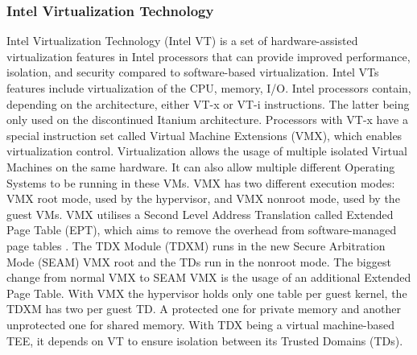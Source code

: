 \subsubsection{Intel Virtualization Technology}
Intel Virtualization Technology (Intel VT) is a set of hardware-assisted virtualization features in Intel processors that can provide improved performance, isolation, and security compared to software-based virtualization. Intel VTs features include virtualization of the CPU, memory, I/O.
Intel processors contain, depending on the architecture, either VT-x or VT-i instructions. The latter being only used on the discontinued Itanium architecture. Processors with VT-x have a special instruction set called Virtual Machine Extensions (VMX), which enables virtualization control. Virtualization allows the usage of multiple isolated Virtual Machines on the same hardware. It can also allow multiple different Operating Systems to be running in these VMs\cite{intel-VT}. VMX has two different execution modes: VMX root mode, used by the hypervisor, and VMX nonroot mode, used by the guest VMs. VMX utilises a Second Level Address Translation called Extended Page Table (EPT), which aims to remove the overhead from software-managed page tables \cite{uhlig_intel_vt_2005}. The TDX Module (TDXM) runs in the new Secure Arbitration Mode (SEAM) VMX root and the TDs run in the nonroot mode. The biggest change from normal VMX to SEAM VMX is the usage of an additional Extended Page Table. With VMX the hypervisor holds only one table per guest kernel, the TDXM has two per guest TD. A protected one for private memory and another unprotected one for shared memory.
With TDX being a virtual machine-based TEE, it depends on VT to ensure isolation between its Trusted Domains (TDs)\cite{cheng_intel_tdx_demystified_2023}.
